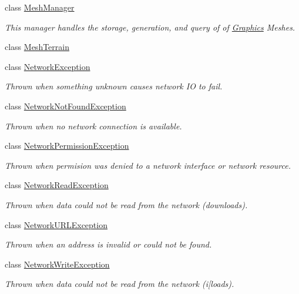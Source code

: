 \begin{DoxyCompactItemize}
class \hyperlink{classMezzanine_1_1MeshManager}{Mesh\-Manager}
\begin{DoxyCompactList}\small\item\em This manager handles the storage, generation, and query of of \hyperlink{namespaceMezzanine_1_1Graphics}{Graphics} Meshes. \end{DoxyCompactList}\item 
class \hyperlink{classMezzanine_1_1MeshTerrain}{Mesh\-Terrain}
\item 
class \hyperlink{classMezzanine_1_1NetworkException}{Network\-Exception}
\begin{DoxyCompactList}\small\item\em Thrown when something unknown causes network I\-O to fail. \end{DoxyCompactList}\item 
class \hyperlink{classMezzanine_1_1NetworkNotFoundException}{Network\-Not\-Found\-Exception}
\begin{DoxyCompactList}\small\item\em Thrown when no network connection is available. \end{DoxyCompactList}\item 
class \hyperlink{classMezzanine_1_1NetworkPermissionException}{Network\-Permission\-Exception}
\begin{DoxyCompactList}\small\item\em Thrown when permision was denied to a network interface or network resource. \end{DoxyCompactList}\item 
class \hyperlink{classMezzanine_1_1NetworkReadException}{Network\-Read\-Exception}
\begin{DoxyCompactList}\small\item\em Thrown when data could not be read from the network (downloads). \end{DoxyCompactList}\item 
class \hyperlink{classMezzanine_1_1NetworkURLException}{Network\-U\-R\-L\-Exception}
\begin{DoxyCompactList}\small\item\em Thrown when an address is invalid or could not be found. \end{DoxyCompactList}\item 
class \hyperlink{classMezzanine_1_1NetworkWriteException}{Network\-Write\-Exception}
\begin{DoxyCompactList}\small\item\em Thrown when data could not be read from the network (i\mbox{[}loads). \end{DoxyCompactList}\item 

\end{DoxyCompactItemize}
